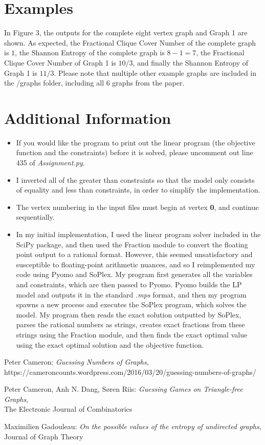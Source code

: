 \documentclass[a4paper]{article}
\begin{document}
\section{Examples}
In Figure 3, the outputs for the complete eight vertex graph and Graph 1 are shown. As expected, the Fractional Clique Cover Number of the complete graph is $1$, the Shannon Entropy of the complete graph is $8 - 1 = 7$, the Fractional Clique Cover Number of Graph 1 is $10/3$, and finally the Shannon Entropy of Graph 1 is $11/3$. Please note that multiple other example graphs are included in the /graphs folder, including all 6 graphs from the paper\cite{Max}.

\section{Additional Information}
\begin{itemize}
\item If you would like the program to print out the linear program (the objective function and the constraints) before it is solved, please uncomment out line 435 of \textit{Assignment.py}.
\item I inverted all of the greater than constraints so that the model only consists of equality and less than constraints, in order to simplify the implementation.
\item The vertex numbering in the input files must begin at vertex \textbf{0}, and continue sequentially. 
\item In my initial implementation, I used the linear program solver included in the SciPy package, and then used the Fraction module to convert the floating point output to a rational format. However, this seemed unsatisfactory and susceptible to floating-point arithmetic nuances, and so I reimplemented my code using Pyomo and SoPlex. My program first generates all the variables and constraints, which are then passed to Pyomo. Pyomo builds the LP model and outputs it in the standard \textit{.mps} format, and then my program spawns a new process and executes the SoPlex program, which solves the model. My program then reads the exact solution outputted by SoPlex, parses the rational numbers as strings, creates exact fractions from these strings using the Fraction module, and then finds the exact optimal value using the exact optimal solution and the objective function. 

\end{itemize}
\begin{thebibliography}{999}

  Peter Cameron:
  \emph{Guessing Numbers of Graphs},
  \\https://cameroncounts.wordpress.com/2016/03/20/guessing-numbers-of-graphs/

  Peter Cameron, Anh N. Dang, S\o ren Riis:
  \emph{Guessing Games on Triangle-free Graphs},
  \\The Electronic Journal of Combinatorics
  
 Maximilien Gadouleau:
 \emph{On the possible values of the entropy of undirected graphs},
\\Journal of Graph Theory

\end{thebibliography}
\end{document}
